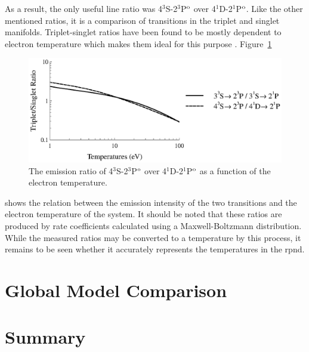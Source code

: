 As a result, the only useful line ratio was 4$^3$S-2$^3$P$^\mathrm{o}$ over
4$^1$D-2$^1$P$^\mathrm{o}$. Like the other mentioned ratios, it is a comparison of
transitions in the triplet and singlet manifolds. Triplet-singlet ratios have
been found to be mostly dependent to electron temperature which makes them ideal
for this purpose \cite{Griem2005}. Figure~\ref{fig:conversion}
\begin{figure}
  \centering
  \includegraphics{./chapters/emissions/figures/conversion.eps}
  \caption{The emission ratio of 4$^3$S-2$^3$P$^\mathrm{o}$ over 4$^1$D-2$^1$P$^\mathrm{o}$ as
  a function of the electron temperature.}
  \label{fig:conversion}
\end{figure}
shows the relation between the emission intensity of the two transitions and the
electron temperature of the system. It should be noted that these ratios are
produced by rate coefficients calculated using a Maxwell-Boltzmann distribution.
While the measured ratios may be converted to a temperature by this process, it
remains to be seen whether it accurately represents the temperatures in the
\acs{rpnd}.



\section{Global Model Comparison}



\section{Summary}
